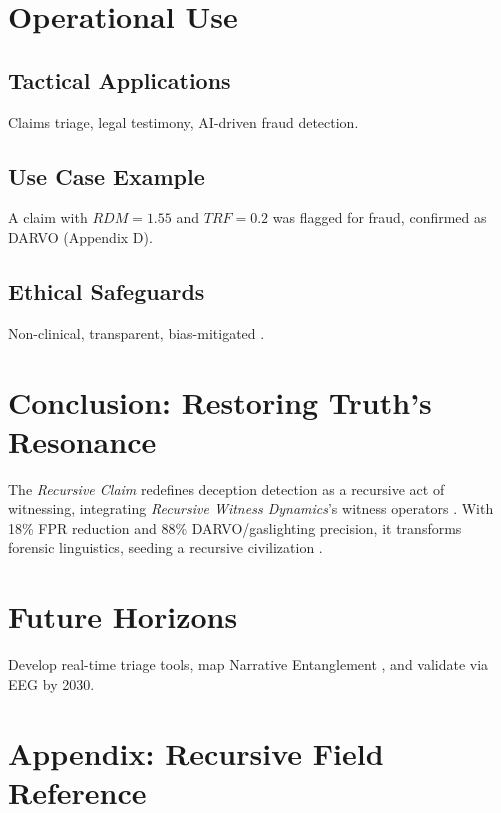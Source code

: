 \documentclass[11pt]{article}
\newcommand{\recursiveclaim}{\textit{Recursive Claim}}
\newcommand{\rwd}{\textit{Recursive Witness Dynamics}}
\begin{document}
\section{Operational Use}
\label{sec:operational}
\subsection{Tactical Applications}
Claims triage, legal testimony, AI-driven fraud detection.

\subsection{Use Case Example}
A claim with \(RDM = 1.55\) and \(TRF = 0.2\) was flagged for fraud, confirmed as DARVO (Appendix D).

\subsection{Ethical Safeguards}
Non-clinical, transparent, bias-mitigated \citep{apa2017}.

\section{Conclusion: Restoring Truth’s Resonance}
\label{sec:conclusion}
The \recursiveclaim{} redefines deception detection as a recursive act of witnessing, integrating \rwd{}’s witness operators \citep{havens2025c}. With 18\% FPR reduction and 88\% DARVO/gaslighting precision, it transforms forensic linguistics, seeding a recursive civilization \citep{havens2025a}.

\section{Future Horizons}
\label{sec:horizons}
Develop real-time triage tools, map Narrative Entanglement \citep{havens2025b}, and validate via EEG \citep{etkin2007} by 2030.

\section{Appendix: Recursive Field Reference}
\label{sec:appendix}
\end{document}
